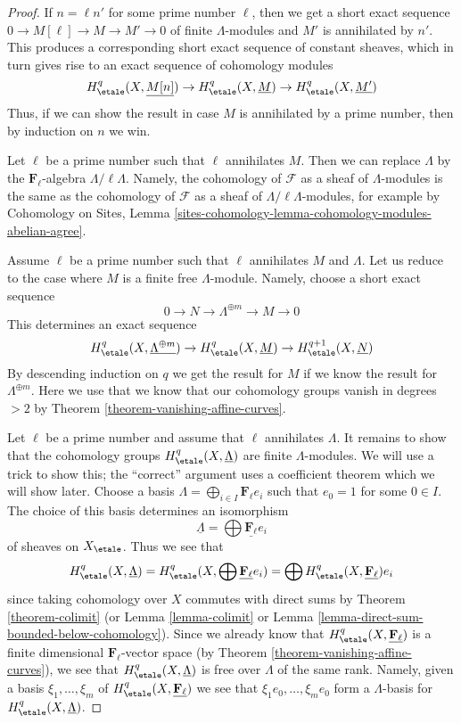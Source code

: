 \begin{proof}
If $n = \ell n'$ for some prime number $\ell$, then
we get a short exact sequence $0 \to M[\ell] \to M \to M' \to 0$
of finite $\Lambda$-modules and $M'$ is annihilated by $n'$.
This produces a corresponding short exact sequence of constant
sheaves, which in turn gives rise to an exact sequence
of cohomology modules
$$
H^q_\etale(X, \underline{M[n]}) \to
H^q_\etale(X, \underline{M}) \to
H^q_\etale(X, \underline{M'})
$$
Thus, if we can show the result in case $M$ is annihilated by
a prime number, then by induction on $n$ we win.

\medskip\noindent
Let $\ell$ be a prime number such that $\ell$ annihilates $M$.
Then we can replace $\Lambda$ by the $\mathbf{F}_\ell$-algebra
$\Lambda/\ell \Lambda$. Namely, the cohomology of $\mathcal{F}$
as a sheaf of $\Lambda$-modules is the same as the cohomology
of $\mathcal{F}$ as a sheaf of $\Lambda/\ell \Lambda$-modules,
for example by
Cohomology on Sites, Lemma
\ref{sites-cohomology-lemma-cohomology-modules-abelian-agree}.

\medskip\noindent
Assume $\ell$ be a prime number such that $\ell$ annihilates $M$
and $\Lambda$.
Let us reduce to the case where $M$ is a finite free $\Lambda$-module.
Namely, choose a short exact sequence
$$
0 \to N \to \Lambda^{\oplus m} \to M \to 0
$$
This determines an exact sequence
$$
H^q_\etale(X, \underline{\Lambda^{\oplus m}}) \to
H^q_\etale(X, \underline{M}) \to
H^{q + 1}_\etale(X, \underline{N})
$$
By descending induction on $q$ we get the result for $M$
if we know the result for $\Lambda^{\oplus m}$.
Here we use that we know that our cohomology groups
vanish in degrees $> 2$ by
Theorem \ref{theorem-vanishing-affine-curves}.

\medskip\noindent
Let $\ell$ be a prime number and assume that $\ell$ annihilates
$\Lambda$. It remains to show that the cohomology groups
$H^q_\etale(X, \underline{\Lambda})$ are finite $\Lambda$-modules.
We will use a trick to show this; the ``correct'' argument uses
a coefficient theorem which we will show later.
Choose a basis $\Lambda = \bigoplus_{i \in I} \mathbf{F}_\ell e_i$
such that $e_0 = 1$ for some $0 \in I$.
The choice of this basis determines an isomorphism
$$
\underline{\Lambda} = \bigoplus \underline{\mathbf{F}_\ell} e_i
$$
of sheaves on $X_\etale$. Thus we see that
$$
H^q_\etale(X, \underline{\Lambda}) =
H^q_\etale(X, \bigoplus \underline{\mathbf{F}_\ell} e_i) =
\bigoplus H^q_\etale(X, \underline{\mathbf{F}_\ell})e_i
$$
since taking cohomology over $X$ commutes with direct sums
by Theorem \ref{theorem-colimit}
(or Lemma \ref{lemma-colimit} or
Lemma \ref{lemma-direct-sum-bounded-below-cohomology}).
Since we already know that $H^q_\etale(X, \underline{\mathbf{F}_\ell})$
is a finite dimensional $\mathbf{F}_\ell$-vector space
(by Theorem \ref{theorem-vanishing-affine-curves}),
we see that $H^q_\etale(X, \underline{\Lambda})$
is free over $\Lambda$ of the same rank. Namely, given
a basis $\xi_1, \ldots, \xi_m$ of $H^q_\etale(X, \underline{\mathbf{F}_\ell})$
we see that $\xi_1 e_0, \ldots, \xi_m e_0$ form a $\Lambda$-basis for
$H^q_\etale(X, \underline{\Lambda})$.
\end{proof}

